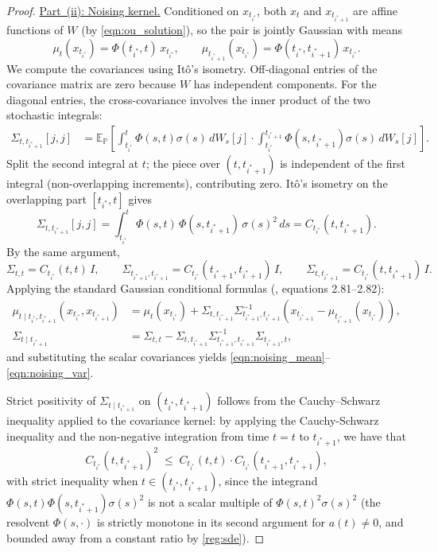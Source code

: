 \documentclass{article}
\newcommand{\PP}{\mathbb{P}}
\newcommand{\EE}{\mathbb{E}}
\begin{document}
\begin{proof}
\medskip\noindent\underline{Part~(ii): Noising kernel.}
Conditioned on $x_{t_{i^*}}$, both $x_t$ and $x_{t_{i^*+1}}$ are affine functions
of $W$ (by \eqref{eqn:ou_solution}), so the pair is jointly Gaussian with means
\[
  \mu_t (x_{t_{i^*}})= \Phi(t_{i^*},t)\,x_{t_{i^*}},
  \qquad
  \mu_{t_{i^*+1}}(x_{t_{i^*}}) = \Phi(t_{i^*},t_{i^*+1})\,x_{t_{i^*}}.
\]
We compute the covariances using Itô's isometry.
Off-diagonal entries of the covariance matrix are zero because $W$ has
independent components.  For the diagonal entries, the cross-covariance
involves the inner product of the two stochastic integrals:
\begin{align*}
  \Sigma_{t,t_{i^*+1}}[j,j]
  &= \EE_\PP\left[
       \int_{t_{i^*}}^t \Phi(s,t)\sigma(s)\,dW_s[j]
       \cdot
       \int_{t_{i^*}}^{t_{i^*+1}}\Phi(s,t_{i^*+1})\sigma(s)\,dW_s[j]
     \right].
\end{align*}
Split the second integral at $t$; the piece over $(t,t_{i^*+1})$ is independent of
the first integral (non-overlapping increments), contributing zero.  Itô's isometry
on the overlapping part $[t_{i^*},t]$ gives
\[
  \Sigma_{t,t_{i^*+1}}[j,j]
  = \int_{t_{i^*}}^{t}\Phi(s,t)\,\Phi(s,t_{i^*+1})\,\sigma(s)^2\,ds
  = C_{t_{i^*}}(t,t_{i^*+1}).
\]
By the same argument,
\[
  \Sigma_{t,t} = C_{t_{i^*}}(t,t)\,I,
  \qquad
  \Sigma_{t_{i^*+1},t_{i^*+1}} = C_{t_{i^*}}(t_{i^*+1},t_{i^*+1})\,I,
  \qquad
  \Sigma_{t,t_{i^*+1}} = C_{t_{i^*}}(t,t_{i^*+1})\,I.
\]
Applying the standard Gaussian conditional formulas
(\cite{bishop2006pattern}, equations 2.81--2.82):
\begin{align*}
  \mu_{t\mid t_{i^*},t_{i^*+1}}(x_{t_{i^*}}, x_{t_{i^*+1}})
  &= \mu_t (x_{t_{i^*}}) + \Sigma_{t,t_{i^*+1}}\Sigma_{t_{i^*+1},t_{i^*+1}}^{-1}
     (x_{t_{i^*+1}}-\mu_{t_{i^*+1}}(x_{t_{i^*}})), \\
  \Sigma_{t\mid t_{i^*+1}}
  &= \Sigma_{t,t} - \Sigma_{t,t_{i^*+1}}\Sigma_{t_{i^*+1},t_{i^*+1}}^{-1}
     \Sigma_{t_{i^*+1},t},
\end{align*}
and substituting the scalar covariances yields
\eqref{eqn:noising_mean}--\eqref{eqn:noising_var}.

Strict positivity of $\Sigma_{t\mid t_{i^*+1}}$ on $(t_{i^*},t_{i^*+1})$ follows
from the Cauchy--Schwarz inequality applied to the covariance kernel: by applying the
 Cauchy-Schwarz inequality and the non-negative integration from time $t=t$ to $t_{i^*+1}$, we have that
\[
  C_{t_{i^*}}(t,t_{i^*+1})^2
  \;\leq\;
  C_{t_{i^*}}(t,t)\cdot C_{t_{i^*}}(t_{i^*+1},t_{i^*+1}),
\]
with strict inequality when $t\in(t_{i^*},t_{i^*+1})$, since the integrand
$\Phi(s,t)\Phi(s,t_{i^*+1})\sigma(s)^2$ is not a scalar multiple of
$\Phi(s,t)^2\sigma(s)^2$ (the resolvent $\Phi(s,\cdot)$ is strictly monotone in
its second argument for $a(t)\neq 0$, and bounded away from a constant ratio by
\ref{reg:sde}).
\end{proof}
\end{document}
